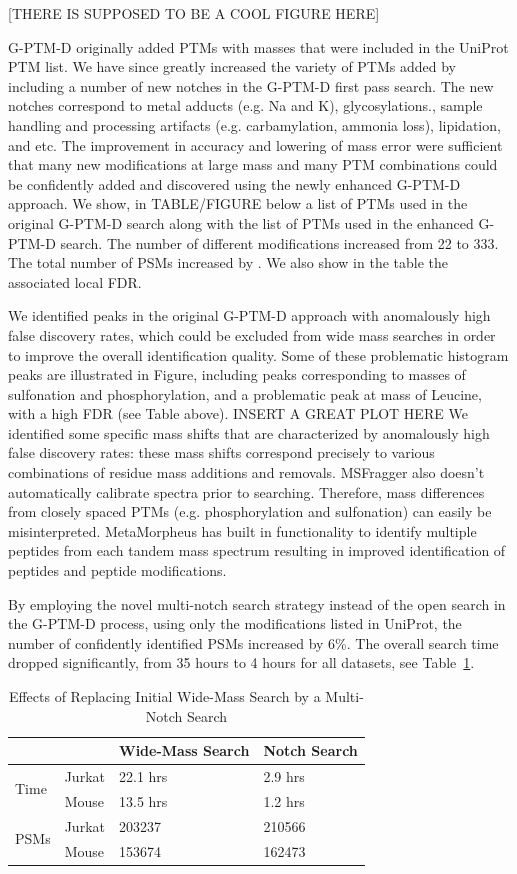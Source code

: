 \documentclass[journal=jprobs,manuscript=article]{achemso}
\begin{document}
[THERE IS SUPPOSED TO BE A COOL FIGURE HERE]

G-PTM-D originally added PTMs with masses that were included in the UniProt PTM list.
We have since greatly increased the variety of PTMs added by including a number of new notches in the G-PTM-D first pass search.
The new notches correspond to metal adducts (e.g. Na and K), glycosylations., sample handling and processing artifacts (e.g. carbamylation, ammonia loss), lipidation, and etc.
The improvement in accuracy and lowering of mass error were sufficient that many new modifications at large mass and many PTM combinations could be confidently added and discovered using the newly enhanced G-PTM-D approach.
We show, in TABLE/FIGURE below a list of PTMs used in the original G-PTM-D search along with the list of PTMs used in the enhanced G-PTM-D search.
The number of different modifications increased from 22 to 333.
The total number of PSMs increased by . We also show in the table the associated local FDR.

We identified peaks in the original G-PTM-D approach with anomalously high false discovery rates, which could be excluded from wide mass searches in order to improve the overall identification quality.
Some of these problematic histogram peaks are illustrated in Figure, including peaks corresponding to masses of sulfonation and phosphorylation, and a problematic peak at mass of Leucine, with a high FDR (see Table above).
INSERT A GREAT PLOT HERE We identified some specific mass shifts that are characterized by anomalously high false discovery rates: these mass shifts correspond precisely to various combinations of residue mass additions and removals.
MSFragger also doesn’t automatically calibrate spectra prior to searching.
Therefore, mass differences from closely spaced PTMs (e.g. phosphorylation and sulfonation) can easily be misinterpreted.
MetaMorpheus has built in functionality to identify multiple peptides from each tandem mass spectrum resulting in improved identification of peptides and peptide modifications.

By employing the novel multi-notch search strategy instead of the open search in the G-PTM-D process, using only the modifications listed in UniProt, the number of confidently identified PSMs increased by 6\%.
The overall search time dropped significantly, from 35 hours to 4 hours for all datasets, see Table~\ref{my-labelff}.

\begin{table}[]
\centering
\caption{Effects of Replacing Initial Wide-Mass Search by a Multi-Notch Search}
\label{my-labelff}
\begin{tabular}{ll|l|l}
                      &        & Wide-Mass Search & Notch Search\\
\hline
\multirow{2}{*}{Time} & Jurkat & 22.1 hrs         & 2.9 hrs    \\
                      & Mouse  & 13.5 hrs         & 1.2 hrs   \\
\hline
\multirow{2}{*}{PSMs} & Jurkat & 203237           & 210566    \\
                      & Mouse  & 153674           & 162473   
\end{tabular}
\end{table}
\end{document}
